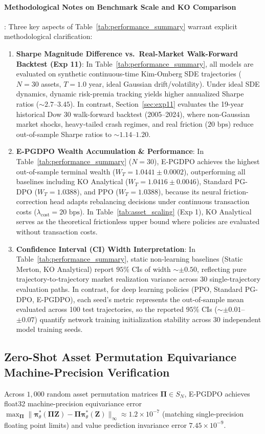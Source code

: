 \documentclass[11pt,a4paper]{article}
\theoremstyle{plain}
\theoremstyle{definition}
\theoremstyle{remark}
\begin{document}
\paragraph{Methodological Notes on Benchmark Scale and KO Comparison}:
Three key aspects of Table~\ref{tab:performance_summary} warrant explicit methodological clarification:
\begin{enumerate}
    \item \textbf{Sharpe Magnitude Difference vs.\ Real-Market Walk-Forward Backtest (Exp 11)}: In Table~\ref{tab:performance_summary}, all models are evaluated on synthetic continuous-time Kim-Omberg SDE trajectories ($N=30$ assets, $T=1.0$ year, ideal Gaussian drift/volatility). Under ideal SDE dynamics, dynamic risk-premia tracking yields higher annualized Sharpe ratios ($\sim 2.7$--$3.45$). In contrast, Section~\ref{sec:exp11} evaluates the 19-year historical Dow 30 walk-forward backtest (2005--2024), where non-Gaussian market shocks, heavy-tailed crash regimes, and real friction ($20\text{ bps}$) reduce out-of-sample Sharpe ratios to $\sim 1.14$--$1.20$.
    \item \textbf{E-PGDPO Wealth Accumulation \& Performance}: In Table~\ref{tab:performance_summary} ($N=30$), E-PGDPO achieves the highest out-of-sample terminal wealth ($W_T = 1.0441 \pm 0.0002$), outperforming all baselines including KO Analytical ($W_T = 1.0416 \pm 0.0046$), Standard PG-DPO ($W_T = 1.0388$), and PPO ($W_T = 1.0388$), because its neural friction-correction head adapts rebalancing decisions under continuous transaction costs ($\lambda_{\text{cost}}=20\text{ bps}$). In Table~\ref{tab:asset_scaling} (Exp 1), KO Analytical serves as the theoretical frictionless upper bound where policies are evaluated without transaction costs.
    \item \textbf{Confidence Interval (CI) Width Interpretation}: In Table~\ref{tab:performance_summary}, static non-learning baselines (Static Merton, KO Analytical) report $95\%$ CIs of width $\sim \pm 0.50$, reflecting pure trajectory-to-trajectory market realization variance across 30 single-trajectory evaluation paths. In contrast, for deep learning policies (PPO, Standard PG-DPO, E-PGDPO), each seed's metric represents the out-of-sample mean evaluated across 100 test trajectories, so the reported $95\%$ CIs ($\sim \pm 0.01$--$\pm 0.07$) quantify network training initialization stability across 30 independent model training seeds.
\end{enumerate}

\subsection{Zero-Shot Asset Permutation Equivariance Machine-Precision Verification}
Across $1,000$ random asset permutation matrices $\mathbf{\Pi} \in S_N$, E-PGDPO achieves float32 machine-precision equivariance error $\max_{\mathbf{\Pi}} \|\mathbf{\pi}_\theta^*(\mathbf{\Pi}\mathbf{Z}) - \mathbf{\Pi}\mathbf{\pi}_\theta^*(\mathbf{Z})\|_\infty \approx 1.2 \times 10^{-7}$ (matching single-precision floating point limits) and value prediction invariance error $7.45 \times 10^{-9}$.
\end{document}
